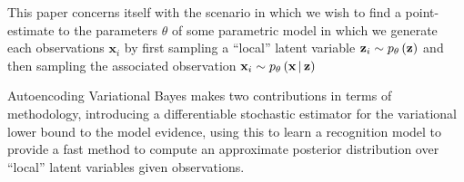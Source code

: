 \documentclass[../report.tex]{subfiles}
\begin{document}
This paper concerns itself with the scenario in which we wish to find a point-estimate to the parameters $\theta$ of some parametric model in which we generate each observations $\mathbf{x}_i$ by first sampling a ``local'' latent variable $\mathbf{z}_i \sim p_\theta \left( \mathbf{z}\right)$ and then sampling the associated observation $\mathbf{x}_i \sim p_\theta \left(\mathbf{x} \, \middle\vert \, \mathbf{z} \right)$

Autoencoding Variational Bayes makes two contributions in terms of methodology, introducing a differentiable stochastic estimator for the variational lower bound to the model evidence, using this to learn a recognition model to provide a fast method to compute an approximate posterior distribution over ``local'' latent variables given observations.
\end{document}

